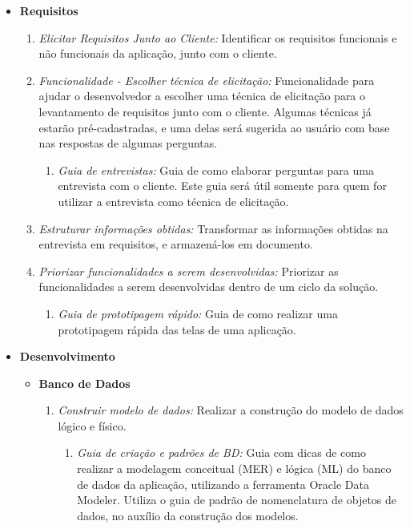\begin{itemize}
\item \textbf{Requisitos}
\begin{enumerate}
\item \textit{Elicitar Requisitos Junto ao Cliente:} Identificar os requisitos funcionais e não funcionais da aplicação, junto com o cliente.
\item \textit{Funcionalidade - Escolher técnica de elicitação:} Funcionalidade para ajudar o desenvolvedor a escolher uma técnica de elicitação para o levantamento de requisitos junto com o cliente. Algumas técnicas já estarão pré-cadastradas, e uma delas será sugerida ao usuário com base nas respostas de algumas perguntas.
\begin{enumerate}
\item \textit{Guia de entrevistas:} Guia de como elaborar perguntas para uma entrevista com o cliente. Este guia será útil somente para quem for utilizar a entrevista como técnica de elicitação.
\end{enumerate}
\item \textit{Estruturar informações obtidas:} Transformar as informações obtidas na entrevista em requisitos, e armazená-los em documento.
\item \textit{Priorizar funcionalidades a serem desenvolvidas:} Priorizar as funcionalidades a serem desenvolvidas dentro de um ciclo da solução.
\begin{enumerate}
\item \textit{Guia de prototipagem rápido:} Guia de como realizar uma prototipagem rápida das telas de uma aplicação.
\end{enumerate}
\end{enumerate}
\item \textbf{Desenvolvimento}
\begin{itemize}
\item \textbf{Banco de Dados}
\begin{enumerate}
\item \textit{Construir modelo de dados:} Realizar a construção do modelo de dados lógico e físico.
\begin{enumerate}
\item \textit{Guia de criação e padrões de BD:} Guia com dicas de como realizar a modelagem conceitual (MER) e lógica (ML) do banco de dados da aplicação, utilizando a ferramenta Oracle Data Modeler. Utiliza o guia de padrão de nomenclatura de objetos de dados, no auxílio da construção dos modelos.
\begin{enumerate}

\end{enumerate}
\end{enumerate}
\end{enumerate}
\end{itemize}
\end{itemize}
